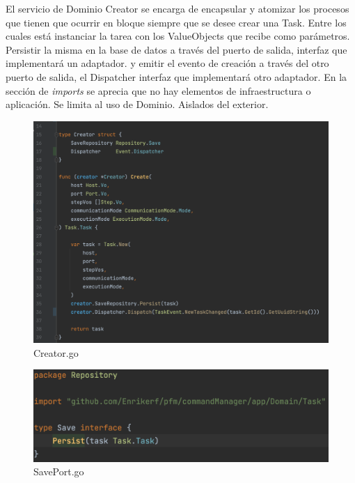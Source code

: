 El servicio de Dominio Creator se encarga de encapsular y atomizar los procesos que tienen que ocurrir en bloque siempre que se desee crear una Task. Entre los cuales está instanciar la tarea con los ValueObjects que recibe como parámetros. Persistir la misma en la base de datos a través del puerto de salida, interfaz que implementará un adaptador. y emitir el evento de creación a través del otro puerto de salida, el Dispatcher interfaz que implementará otro adaptador. En la sección de \textit{imports} se aprecia que no hay elementos de infraestructura o aplicación. Se limita al uso de Dominio. Aislados del exterior.

\begin{figure}[H]
    \centering
    \includegraphics[height=0.4\textheight]{./part/Ejecucion/Seguimiento/CreateTaskUseCase/img/PFM - creator}
    \caption{Creator.go}\label{fig:Creator}
\end{figure}

\begin{figure}[H]
    \centering
    \includegraphics[height=0.2\textheight]{./part/Ejecucion/Seguimiento/CreateTaskUseCase/img/PFM - SavePort}
    \caption{SavePort.go}\label{fig:SavePort}
\end{figure}

